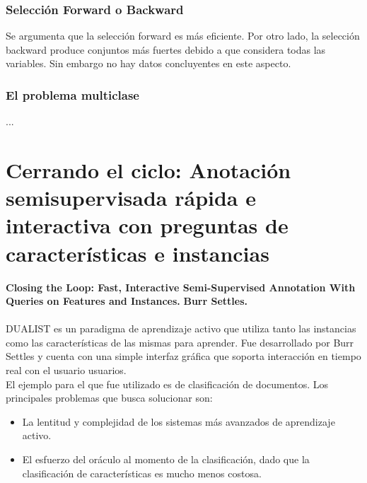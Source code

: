 \documentclass[11pt,spanish]{article}
\begin{document}
\subsubsection{Selección Forward o Backward}
Se argumenta que la selección forward es más eficiente. Por otro lado, la selección backward produce conjuntos más fuertes debido a que considera todas las variables.
Sin embargo no hay datos concluyentes en este aspecto.
\subsubsection{El problema multiclase}
...

\section{Cerrando el ciclo: Anotación semisupervisada rápida e interactiva con
        preguntas de características e instancias}
\textbf{Closing the Loop: Fast, Interactive Semi-Supervised Annotation
With Queries on Features and Instances.}
\textbf{Burr Settles.}\\\\
DUALIST es un paradigma de aprendizaje activo que utiliza tanto las instancias
como las características de las mismas para aprender. Fue desarrollado por Burr
Settles y cuenta con una simple interfaz gráfica que soporta interacción en
tiempo real con el usuario usuarios. \\
El ejemplo para el que fue utilizado es de clasificación de documentos.
Los principales problemas que busca solucionar son:
\begin{itemize}
    \item La lentitud y complejidad de los sistemas más avanzados de aprendizaje
    activo.
    \item El esfuerzo del oráculo al momento de la clasificación, dado que la
    clasificación de características es mucho menos costosa.
\end{itemize}
\end{document}
